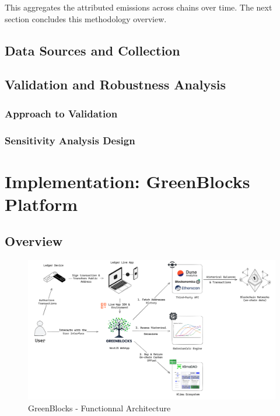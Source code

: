 \documentclass[11pt]{report}
\begin{document}
This aggregates the attributed emissions across chains over time. The next section concludes this methodology overview.

\section{Data Sources and Collection}
\section{Validation and Robustness Analysis}
\subsection{Approach to Validation}
\subsection{Sensitivity Analysis Design}

\chapter{Implementation: GreenBlocks Platform}
\section{Overview}
\begin{figure}[h!]
    \centering
    \centerline{\includegraphics[scale=0.08]{figures/functionnal architecture.png}}
    \caption{GreenBlocks - Functionnal Architecture}
    \label{fig:functionnal_architecture}
\end{figure}
\end{document}
